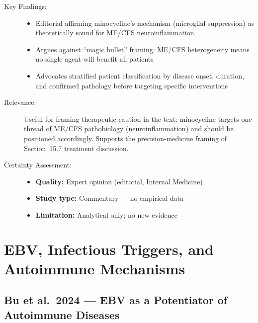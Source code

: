 
\begin{description}
    \item[Key Findings:]
    \begin{itemize}
        \item Editorial affirming minocycline's mechanism (microglial suppression) as theoretically sound for ME/CFS neuroinflammation
        \item Argues against ``magic bullet'' framing: ME/CFS heterogeneity means no single agent will benefit all patients
        \item Advocates stratified patient classification by disease onset, duration, and confirmed pathology before targeting specific interventions
    \end{itemize}
    \item[Relevance:] Useful for framing therapeutic caution in the text: minocycline targets one thread of ME/CFS pathobiology (neuroinflammation) and should be positioned accordingly. Supports the precision-medicine framing of Section~15.7 treatment discussion.
    \item[Certainty Assessment:]
    \begin{itemize}
        \item \textbf{Quality:} Expert opinion (editorial, Internal Medicine)
        \item \textbf{Study type:} Commentary --- no empirical data
        \item \textbf{Limitation:} Analytical only; no new evidence
    \end{itemize}
\end{description}

\section{EBV, Infectious Triggers, and Autoimmune Mechanisms}
\label{sec:bib-ebv-autoimmune}

\subsection{Bu et al.\ 2024 --- EBV as a Potentiator of Autoimmune Diseases}

